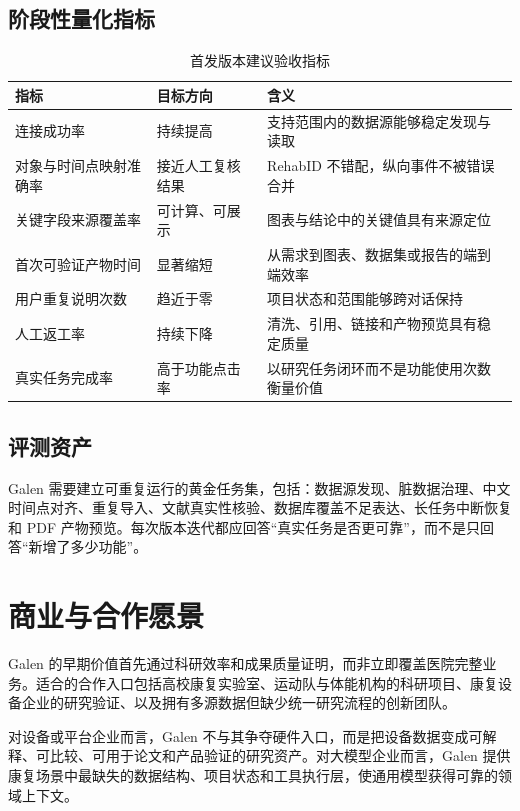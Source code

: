 \documentclass[11pt,a4paper,UTF8]{ctexart}
\begin{document}
\subsection{阶段性量化指标}

\begin{table}[htbp]
\centering
\caption{首发版本建议验收指标}
\begin{tabularx}{\textwidth}{@{}L{4.2cm}L{3.0cm}Y@{}}
\toprule
指标 & 目标方向 & 含义 \\
\midrule
连接成功率 & 持续提高 & 支持范围内的数据源能够稳定发现与读取 \\
对象与时间点映射准确率 & 接近人工复核结果 & RehabID 不错配，纵向事件不被错误合并 \\
关键字段来源覆盖率 & 可计算、可展示 & 图表与结论中的关键值具有来源定位 \\
首次可验证产物时间 & 显著缩短 & 从需求到图表、数据集或报告的端到端效率 \\
用户重复说明次数 & 趋近于零 & 项目状态和范围能够跨对话保持 \\
人工返工率 & 持续下降 & 清洗、引用、链接和产物预览具有稳定质量 \\
真实任务完成率 & 高于功能点击率 & 以研究任务闭环而不是功能使用次数衡量价值 \\
\bottomrule
\end{tabularx}
\end{table}

\subsection{评测资产}

Galen 需要建立可重复运行的黄金任务集，包括：数据源发现、脏数据治理、中文时间点对齐、重复导入、文献真实性核验、数据库覆盖不足表达、长任务中断恢复和 PDF 产物预览。每次版本迭代都应回答“真实任务是否更可靠”，而不是只回答“新增了多少功能”。

\section{商业与合作愿景}

Galen 的早期价值首先通过科研效率和成果质量证明，而非立即覆盖医院完整业务。适合的合作入口包括高校康复实验室、运动队与体能机构的科研项目、康复设备企业的研究验证、以及拥有多源数据但缺少统一研究流程的创新团队。

对设备或平台企业而言，Galen 不与其争夺硬件入口，而是把设备数据变成可解释、可比较、可用于论文和产品验证的研究资产。对大模型企业而言，Galen 提供康复场景中最缺失的数据结构、项目状态和工具执行层，使通用模型获得可靠的领域上下文。
\end{document}
